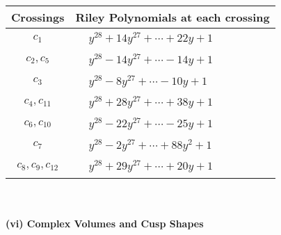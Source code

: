 \documentclass[1p]{elsarticle_modified}
\theoremstyle{definition}
\begin{document}
\begin{tabular}{m{50pt}|m{274pt}}
Crossings & \hspace{64pt}Riley Polynomials at each crossing \\
\hline $$\begin{aligned}c_{1}\end{aligned}$$&$\begin{aligned}
&y^{28}+14 y^{27}+\cdots+22 y+1
\end{aligned}$\\
\hline $$\begin{aligned}c_{2},c_{5}\end{aligned}$$&$\begin{aligned}
&y^{28}-14 y^{27}+\cdots-14 y+1
\end{aligned}$\\
\hline $$\begin{aligned}c_{3}\end{aligned}$$&$\begin{aligned}
&y^{28}-8 y^{27}+\cdots-10 y+1
\end{aligned}$\\
\hline $$\begin{aligned}c_{4},c_{11}\end{aligned}$$&$\begin{aligned}
&y^{28}+28 y^{27}+\cdots+38 y+1
\end{aligned}$\\
\hline $$\begin{aligned}c_{6},c_{10}\end{aligned}$$&$\begin{aligned}
&y^{28}-22 y^{27}+\cdots-25 y+1
\end{aligned}$\\
\hline $$\begin{aligned}c_{7}\end{aligned}$$&$\begin{aligned}
&y^{28}-2 y^{27}+\cdots+88 y^2+1
\end{aligned}$\\
\hline $$\begin{aligned}c_{8},c_{9},c_{12}\end{aligned}$$&$\begin{aligned}
&y^{28}+29 y^{27}+\cdots+20 y+1
\end{aligned}$\\
\hline
\end{tabular}\\~\\
\newpage\flushleft \textbf{(vi) Complex Volumes and Cusp Shapes}
\end{document}
